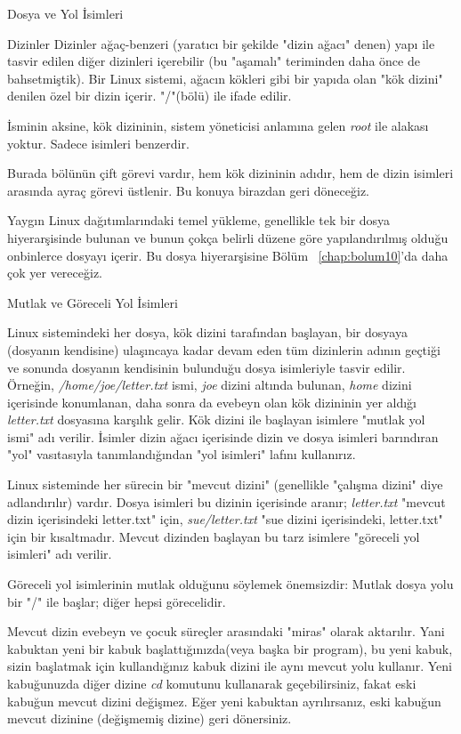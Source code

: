 \begin{section}{Dosya ve Yol İsimleri}
\begin{subsection}{Dizinler}
	Dizinler ağaç-benzeri (yaratıcı bir şekilde "dizin ağacı" denen) yapı ile tasvir edilen diğer dizinleri içerebilir (bu "aşamalı" teriminden daha önce de bahsetmiştik). Bir Linux sistemi, ağacın kökleri gibi bir yapıda olan "kök dizini" denilen özel bir dizin içerir. "/"(bölü) ile ifade edilir.
	
	İsminin aksine, kök dizininin, sistem yöneticisi anlamına gelen \emph{root} ile alakası yoktur. Sadece isimleri benzerdir.
	
	Burada bölünün çift görevi vardır, hem kök dizininin adıdır, hem de dizin isimleri arasında ayraç görevi üstlenir. Bu konuya birazdan geri döneceğiz.
	
	Yaygın Linux dağıtımlarındaki temel yükleme, genellikle tek bir dosya hiyerarşisinde bulunan ve bunun çokça belirli düzene göre yapılandırılmış olduğu onbinlerce dosyayı içerir. Bu dosya hiyerarşisine Bölüm ~\ref{chap:bolum10}'da daha çok yer vereceğiz.
\end{subsection}
\begin{subsection}{Mutlak ve Göreceli Yol İsimleri}

Linux sistemindeki her dosya, kök dizini tarafından başlayan, bir dosyaya (dosyanın kendisine) ulaşıncaya kadar devam eden tüm dizinlerin adının geçtiği ve sonunda dosyanın kendisinin bulunduğu dosya isimleriyle tasvir edilir. Örneğin, \emph{/home/joe/letter.txt} ismi, \emph{joe} dizini altında bulunan, \emph{home} dizini içerisinde konumlanan, daha sonra da evebeyn olan kök dizininin yer aldığı \emph{letter.txt} dosyasına karşılık gelir. Kök dizini ile başlayan isimlere "mutlak yol ismi" adı verilir. İsimler dizin ağacı içerisinde dizin ve dosya isimleri barındıran "yol" vasıtasıyla tanımlandığından "yol isimleri" lafını kullanırız.

	Linux sisteminde her sürecin bir "mevcut dizini" (genellikle "çalışma dizini" diye adlandırılır) vardır. Dosya isimleri bu dizinin içerisinde aranır; \emph{letter.txt} "mevcut dizin içerisindeki letter.txt" için, \emph{sue/letter.txt} "sue dizini içerisindeki, letter.txt" için bir kısaltmadır. Mevcut dizinden başlayan bu tarz isimlere "göreceli yol isimleri" adı verilir.
	
	Göreceli yol isimlerinin mutlak olduğunu söylemek önemsizdir: Mutlak dosya yolu bir "/" ile başlar; diğer hepsi görecelidir.
	
Mevcut dizin evebeyn ve çocuk süreçler arasındaki "miras" olarak aktarılır. Yani kabuktan yeni bir kabuk başlattığınızda(veya başka bir program), bu yeni kabuk, sizin başlatmak için kullandığınız kabuk dizini ile aynı mevcut yolu kullanır. Yeni kabuğunuzda diğer dizine \emph{cd} komutunu kullanarak geçebilirsiniz, fakat eski kabuğun mevcut dizini değişmez. Eğer yeni kabuktan ayrılırsanız, eski kabuğun mevcut dizinine (değişmemiş dizine) geri dönersiniz. 
	

\end{subsection}
\end{section}
